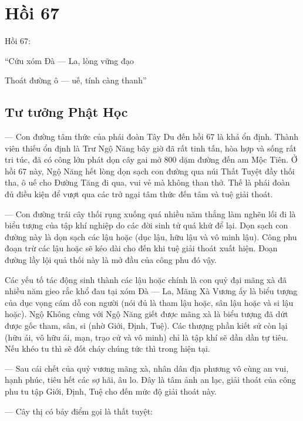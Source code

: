 \chapter{Hồi 67} %
\label{cha:hoi_67}

Hồi 67:

\begin{itshape}
``Cứu xóm Đà — La, lòng vững đạo

Thoát đường ô — uế, tính càng thanh''
\end{itshape}

\section{Tư tưởng Phật Học} %
\label{sec:67_phat_hoc}

 —  Con đường tâm thức của phái đoàn Tây Du đến hồi 67 là khá ổn định. Thành viên thiếu ổn định là Trư Ngộ Năng bây giờ đã rất tinh tấn, hòa hợp và sống rất tri túc, đã có công lớn phát dọn cây gai mở 800 dặm đường đến am Mộc Tiên. Ở hồi 67 này, Ngộ Năng hết lòng dọn sạch con đường qua núi Thất Tuyệt đầy thối tha, ô uế cho Đường Tăng đi qua, vui vẻ mà không than thở. Thế là phái đoàn đủ điều kiện để vượt qua các trở ngại tâm thức đến tâm và tuệ giải thoát.

 —  Con đường trái cây thối rụng xuống quá nhiều năm thắng làm nghẽn lối đi là biểu tượng của tập khí nghiệp do các đời sinh tử quá khứ để lại. Dọn sạch con đường này là dọn sạch các lậu hoặc (dục lậu, hữu lậu và vô minh lậu). Công phu đoạn trừ các lậu hoặc sẽ kéo dài cho đến khi tuệ giải thoát xuất hiện. Đoạn đường lầy lội quả thối này là mở đầu của công phu đó vậy.

Các yếu tố tác động sinh thành các lậu hoặc chính là con quỷ đại mãng xà đã nhiều năm gieo rắc khổ đau tại xóm Đà — La, Mãng Xà Vương ấy là biểu tượng của dục vọng cám dỗ con người (nói đủ là tham lậu hoặc, sân lậu hoặc và si lậu hoặc). Ngộ Không cùng với Ngộ Năng giết được mãng xà là biểu tượng đã dứt được gốc tham, sân, si (nhờ Giới, Định, Tuệ). Các thượng phần kiết sử còn lại (hữu ái, vô hữu ái, mạn, trạo cử và vô minh) chỉ là tập khí sẽ dần dần tự tiêu. Nếu khéo tu thì sẽ đốt cháy chúng tức thì trong hiện tại.

 —  Sau cái chết của quỷ vương mãng xà, nhân dân địa phương vô cùng an vui, hạnh phúc, tiêu hết các sợ hãi, âu lo. Đây là tâm ảnh an lạc, giải thoát của công phu tu tập Giới, Định, Tuệ cho đến mức độ giải thoát này.

 —  Cây thị có bảy điểm gọi là thất tuyệt:

